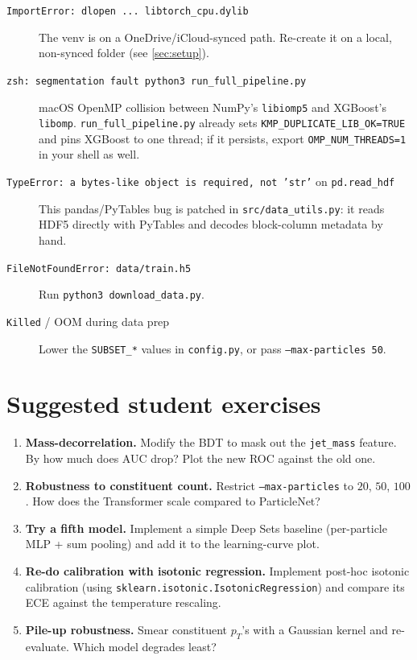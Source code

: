\documentclass[11pt,a4paper]{article}
\begin{document}
\begin{description}
\item[\texttt{ImportError: dlopen ... libtorch\_cpu.dylib}]\quad
The venv is on a OneDrive/iCloud-synced path. Re-create it on a
local, non-synced folder (see \cref{sec:setup}).

\item[\texttt{zsh: segmentation fault python3 run\_full\_pipeline.py}]\quad
macOS OpenMP collision between NumPy's \texttt{libiomp5} and
XGBoost's \texttt{libomp}. \texttt{run\_full\_pipeline.py} already
sets \texttt{KMP\_DUPLICATE\_LIB\_OK=TRUE} and pins XGBoost to one
thread; if it persists, export
\texttt{OMP\_NUM\_THREADS=1} in your shell as well.

\item[\texttt{TypeError: a bytes-like object is required, not 'str'}
on \texttt{pd.read\_hdf}]\quad This pandas/PyTables bug is patched
in \texttt{src/data\_utils.py}: it reads HDF5 directly with
PyTables and decodes block-column metadata by hand.

\item[\texttt{FileNotFoundError: data/train.h5}]\quad Run
\texttt{python3 download\_data.py}.

\item[\texttt{Killed} / OOM during data prep]\quad Lower the
\texttt{SUBSET\_*} values in \texttt{config.py}, or pass
\texttt{--max-particles 50}.
\end{description}

\section{Suggested student exercises}\label{sec:exercises}

\begin{enumerate}
\item \textbf{Mass-decorrelation.}  Modify the BDT to mask out the
      \texttt{jet\_mass} feature. By how much does AUC drop? Plot
      the new ROC against the old one.
\item \textbf{Robustness to constituent count.}  Restrict
      \texttt{--max-particles} to $20$, $50$, $100$. How does the
      Transformer scale compared to ParticleNet?
\item \textbf{Try a fifth model.}  Implement a simple Deep Sets
      baseline (per-particle MLP + sum pooling) and add it to the
      learning-curve plot.
\item \textbf{Re-do calibration with isotonic regression.}
      Implement post-hoc isotonic calibration (using
      \texttt{sklearn.isotonic.IsotonicRegression}) and compare its
      ECE against the temperature rescaling.
\item \textbf{Pile-up robustness.}  Smear constituent $p_T$'s with
      a Gaussian kernel and re-evaluate. Which model degrades
      least?
\end{enumerate}
\end{document}
